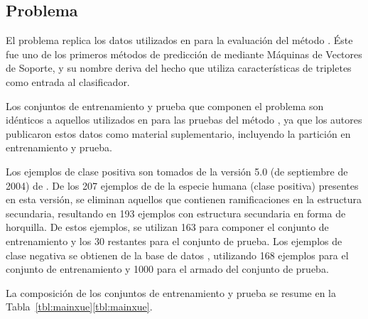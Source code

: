 %
%
\subsection{Problema \tripletsvm}
%
El problema \prob{\tripletsvm} replica los datos utilizados
en \cite{xue} para la evaluación del método \work{\tripletsvm}.
Éste fue uno de los primeros métodos de predicción de 
mediante Máquinas de Vectores de Soporte, y su nombre deriva del hecho
que utiliza características de tripletes como entrada al clasificador.

Los conjuntos de entrenamiento y prueba que componen el problema
\prob{\tripletsvm} son idénticos a aquellos utilizados en \cite{xue}
para las pruebas del método \work{\tripletsvm}, ya que los autores
publicaron estos datos como material suplementario, incluyendo la
partición en entrenamiento y prueba.

Los ejemplos de clase positiva son tomados de la versión 5.0 (de
septiembre de 2004) de \work\mirbase.
De los 207 ejemplos de  de la especie humana (clase
positiva) presentes en esta versión, se eliminan aquellos que
contienen ramificaciones en la estructura secundaria, resultando en
193 ejemplos con estructura secundaria en forma de horquilla.
De estos ejemplos, se utilizan 163 para componer el conjunto de
entrenamiento y los 30 restantes para el conjunto de prueba.
Los ejemplos de clase negativa se obtienen de la base de datos
, utilizando 168 ejemplos para el conjunto de
entrenamiento y 1000 para el armado del conjunto de prueba.

La composición de los conjuntos de entrenamiento y prueba se resume en
la \iflatexml{}Tabla~\ref{tbl:mainxue}\else\autoref{tbl:mainxue}\fi.
